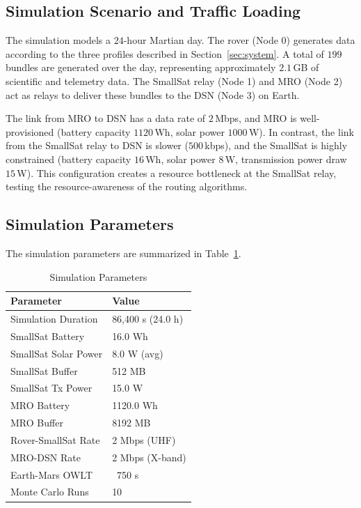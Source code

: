 \documentclass[a4paper,fleqn]{cas-dc}
\begin{document}
\subsection{Simulation Scenario and Traffic Loading}
The simulation models a $24$-hour Martian day. The rover (Node 0) generates data according to the three profiles described in Section~\ref{sec:system}. A total of $199$ bundles are generated over the day, representing approximately $2.1\,$GB of scientific and telemetry data. The SmallSat relay (Node 1) and MRO (Node 2) act as relays to deliver these bundles to the DSN (Node 3) on Earth. 

The link from MRO to DSN has a data rate of $2\,$Mbps, and MRO is well-provisioned (battery capacity $1120\,$Wh, solar power $1000\,$W). In contrast, the link from the SmallSat relay to DSN is slower ($500\,$kbps), and the SmallSat is highly constrained (battery capacity $16\,$Wh, solar power $8\,$W, transmission power draw $15\,$W). This configuration creates a resource bottleneck at the SmallSat relay, testing the resource-awareness of the routing algorithms.

\subsection{Simulation Parameters}
The simulation parameters are summarized in Table~\ref{tab:params}.

\begin{table}[t]
\centering
\caption{Simulation Parameters}
\label{tab:params}
\begin{tabular}{ll}
\hline
\textbf{Parameter} & \textbf{Value} \\
\hline
Simulation Duration & 86,400 s (24.0 h) \\
SmallSat Battery & 16.0 Wh \\
SmallSat Solar Power & 8.0 W (avg) \\
SmallSat Buffer & 512 MB \\
SmallSat Tx Power & 15.0 W \\
MRO Battery & 1120.0 Wh \\
MRO Buffer & 8192 MB \\
Rover-SmallSat Rate & 2 Mbps (UHF) \\
MRO-DSN Rate & 2 Mbps (X-band) \\
Earth-Mars OWLT & ~750 s \\
Monte Carlo Runs & 10 \\
\hline
\end{tabular}
\end{table}
\end{document}
